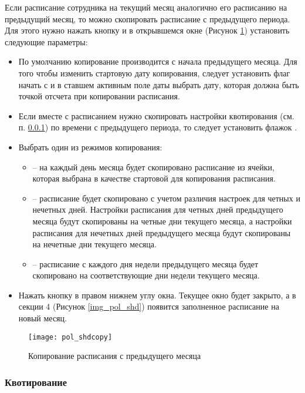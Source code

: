 Если расписание сотрудника на текущий месяц аналогично его расписанию на предыдущий месяц, то можно скопировать расписание с предыдущего периода. Для этого нужно нажать кнопку  и в открывшемся окне (Рисунок \ref{img_pol_shdcopy}) установить следующие параметры:
\begin{itemize}
 \item По умолчанию копирование производится с начала предыдущего месяца. Для того чтобы изменить стартовую дату копирования, следует установить флаг начать с и в ставшем активным поле даты выбрать дату, которая должна быть точкой отсчета при копировании расписания.
 \item Если вместе с расписанием нужно скопировать настройки квотирования (см. п. \ref{pol_shdkv}) по времени с предыдущего периода, то следует установить флажок .
 \item Выбрать один из режимов копирования:
 \begin{itemize}
  \item {} – на каждый день месяца будет скопировано расписание из ячейки, которая выбрана в качестве стартовой для копирования расписания.
  \item {} – расписание будет скопировано с учетом различия настроек для четных и нечетных дней. Настройки расписания для четных дней предыдущего месяца будут скопированы на четные дни текущего месяца, а настройки расписания для нечетных дней предыдущего месяца будут скопированы на нечетные дни текущего месяца.
  \item {} – расписание с каждого дня недели предыдущего месяца будет скопировано на соответствующие дни недели текущего месяца.
 \end{itemize}	
 \item Нажать кнопку   в правом нижнем углу окна. Текущее окно будет закрыто, а в секции 4 (Рисунок \ref{img_pol_shd}) появится заполненное расписание на новый месяц.
\end{itemize}

\begin{figure}[ht]\centering
 \texttt{[image: pol\_shdcopy]}
 \caption{Копирование расписания с предыдущего месяца}
 \label{img_pol_shdcopy}
\end{figure}

\subsubsection{Квотирование} \label{pol_shdkv}

